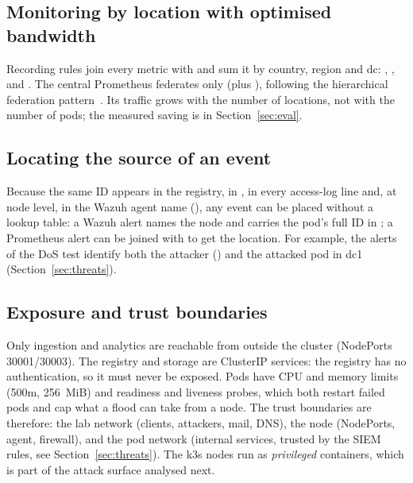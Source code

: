\subsection{Monitoring by location with optimised bandwidth}

Recording rules join every metric with  and sum it by country, region and dc:
, ,
 and . The
central Prometheus federates only  (plus
), following the hierarchical federation pattern~\cite{prometheus_federation}. Its
traffic grows with the number of locations, not with the number of pods; the measured saving is in
Section~\ref{sec:eval}.

\subsection{Locating the source of an event}

Because the same ID appears in the registry, in , in every access-log line
and, at node level, in the Wazuh agent name (), any
event can be placed without a lookup table: a Wazuh alert names the node and carries the pod's full
ID in ; a Prometheus alert can be joined with  to get the
location. For example, the alerts of the DoS test identify both the attacker () and the
attacked pod in dc1 (Section~\ref{sec:threats}).

\subsection{Exposure and trust boundaries}

Only ingestion and analytics are reachable from outside the cluster (NodePorts 30001/30003). The
registry and storage are ClusterIP services: the registry has no authentication, so it must never
be exposed. Pods have CPU and memory limits (500m, 256~MiB) and readiness and liveness probes, which
both restart failed pods and cap what a flood can take from a node. The trust boundaries are
therefore: the lab network (clients, attackers, mail, DNS), the node (NodePorts, agent, firewall),
and the pod network (internal services, trusted by the SIEM rules, see
Section~\ref{sec:threats}). The k3s nodes run as \emph{privileged} containers, which is part of the
attack surface analysed next.
